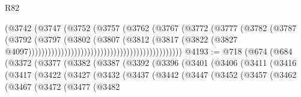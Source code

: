 \begin{lexlean}{R82}
\begin{coremodule}
                                                              (@3742
                                                                (@3747
                                                                  (@3752
                                                                    (@3757
                                                                      (@3762
                                                                        (@3767
                                                                          (@3772
                                                                            (@3777
                                                                              (@3782
                                                                                (@3787
                                                                                  (@3792
                                                                                    (@3797
                                                                                      (@3802
                                                                                        (@3807
                                                                                          (@3812
                                                                                            (@3817
                                                                                              (@3822
                                                                                                (@3827
                                                                                                  @4097)))))))))))))))))))))))))))))))))))))))))))))))
@4193 := @718
    (@674
      (@684
        (@3372
          (@3377
            (@3382
              (@3387
                (@3392
                  (@3396
                    (@3401
                      (@3406
                        (@3411
                          (@3416
                            (@3417
                              (@3422
                                (@3427
                                  (@3432
                                    (@3437
                                      (@3442
                                        (@3447
                                          (@3452
                                            (@3457
                                              (@3462
                                                (@3467
                                                  (@3472
                                                    (@3477
                                                      (@3482

\end{coremodule}
\end{lexlean}
